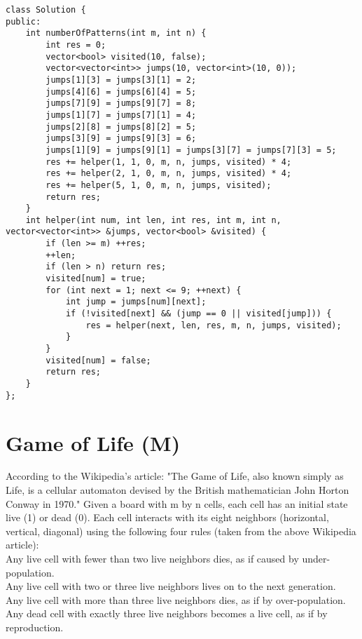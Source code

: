 \begin{lstlisting}
class Solution {
public:
    int numberOfPatterns(int m, int n) {
        int res = 0;
        vector<bool> visited(10, false);
        vector<vector<int>> jumps(10, vector<int>(10, 0));
        jumps[1][3] = jumps[3][1] = 2;
        jumps[4][6] = jumps[6][4] = 5;
        jumps[7][9] = jumps[9][7] = 8;
        jumps[1][7] = jumps[7][1] = 4;
        jumps[2][8] = jumps[8][2] = 5;
        jumps[3][9] = jumps[9][3] = 6;
        jumps[1][9] = jumps[9][1] = jumps[3][7] = jumps[7][3] = 5;
        res += helper(1, 1, 0, m, n, jumps, visited) * 4;
        res += helper(2, 1, 0, m, n, jumps, visited) * 4;
        res += helper(5, 1, 0, m, n, jumps, visited);
        return res;
    }
    int helper(int num, int len, int res, int m, int n, vector<vector<int>> &jumps, vector<bool> &visited) {
        if (len >= m) ++res;
        ++len;
        if (len > n) return res;
        visited[num] = true;
        for (int next = 1; next <= 9; ++next) {
            int jump = jumps[num][next];
            if (!visited[next] && (jump == 0 || visited[jump])) {
                res = helper(next, len, res, m, n, jumps, visited);
            }
        }
        visited[num] = false;
        return res;
    }
};
\end{lstlisting}


\section{Game of Life (M)}
According to the Wikipedia's article: "The Game of Life, also known simply as Life, is a cellular automaton devised by the British mathematician John Horton Conway in 1970." Given a board with m by n cells, each cell has an initial state live (1) or dead (0). Each cell interacts with its eight neighbors (horizontal, vertical, diagonal) using the following four rules (taken from the above Wikipedia article):\\

    Any live cell with fewer than two live neighbors dies, as if caused by under-population.\\
    Any live cell with two or three live neighbors lives on to the next generation.\\
    Any live cell with more than three live neighbors dies, as if by over-population.\\
    Any dead cell with exactly three live neighbors becomes a live cell, as if by reproduction.\\

